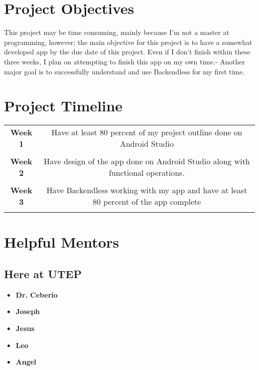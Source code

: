 \documentclass[20pt]{article}
\begin{document}
	\section{Project Objectives}
		\hspace{.25 in}This project may be time consuming, mainly because I'm not a master at programming, however; the main objective for this project is to have a somewhat developed app by the due date of this project. Even if I don't finish within these three weeks, I plan on attempting to finish this app on my own time.\newline - Another major goal is to successfully understand and use Backendless for my first time.
		
	\section{Project Timeline}
		\begin{tabular}{c|c}
			\textbf{Week 1} & Have at least 80 percent of my project outline done on Android Studio\\ \\
			\hline
			\textbf{Week 2} & Have design of the app done on Android Studio along with functional operations.\\ \\
			\hline
			\textbf{Week 3} & Have Backendless working with my app and have at least 80 percent of the app complete\\ \\	
		\end{tabular}
	
	\section{Helpful Mentors}
		\subsection*{Here at UTEP}
			\begin{itemize}
				\item \textbf{Dr. Ceberio}\\
				\item \textbf{Joseph}\\
				\item \textbf{Jesus}\\
				\item \textbf{Leo}\\
				\item \textbf{Angel}\\
			\end{itemize}
\end{document}
